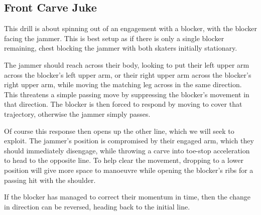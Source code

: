 \subsection*{Front Carve Juke}
\label{drill:last_blocker/front_carve}

This drill is about spinning out of an engagement with a blocker, with the blocker facing the jammer.
This is best setup as if there is only a single blocker remaining, chest blocking the jammer with both skaters initially stationary.  
 
The jammer should reach across their body, looking to put their left upper arm across the blocker's left upper arm, or their right upper arm across the blocker's right upper arm, while moving the matching leg across in the same direction.   
This threatens a simple passing move by suppressing the blocker's movement in that direction. 
The blocker is then forced to respond by moving to cover that trajectory, otherwise the jammer simply passes. 


Of course this response then opens up the other line, which we will seek to exploit.
The jammer's position is compromised by their engaged arm, which they should immediately disengage, while throwing a carve into toe-stop acceleration to head to the opposite line. 
To help clear the movement, dropping to a lower position will give more space to manoeuvre while opening the blocker's ribs for a passing hit with the shoulder. 


If the blocker has managed to correct their momentum in time, then the change in direction can be reversed, heading back to the initial line. 


